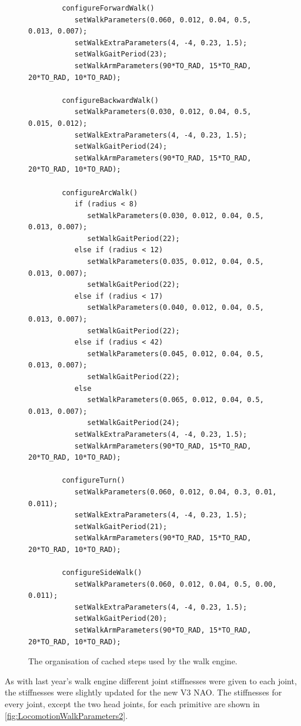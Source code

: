 \begin{figure}
	\begin{center}
		{\scriptsize\begin{verbatim}
		configureForwardWalk()
		   setWalkParameters(0.060, 0.012, 0.04, 0.5, 0.013, 0.007);
		   setWalkExtraParameters(4, -4, 0.23, 1.5);
		   setWalkGaitPeriod(23);
		   setWalkArmParameters(90*TO_RAD, 15*TO_RAD, 20*TO_RAD, 10*TO_RAD);

		configureBackwardWalk()
		   setWalkParameters(0.030, 0.012, 0.04, 0.5, 0.015, 0.012);
		   setWalkExtraParameters(4, -4, 0.23, 1.5);
		   setWalkGaitPeriod(24);
		   setWalkArmParameters(90*TO_RAD, 15*TO_RAD, 20*TO_RAD, 10*TO_RAD);

		configureArcWalk()
		   if (radius < 8)
		      setWalkParameters(0.030, 0.012, 0.04, 0.5, 0.013, 0.007);
		      setWalkGaitPeriod(22);
		   else if (radius < 12)
		      setWalkParameters(0.035, 0.012, 0.04, 0.5, 0.013, 0.007);
		      setWalkGaitPeriod(22);
		   else if (radius < 17)
		      setWalkParameters(0.040, 0.012, 0.04, 0.5, 0.013, 0.007);
		      setWalkGaitPeriod(22);
		   else if (radius < 42)
		      setWalkParameters(0.045, 0.012, 0.04, 0.5, 0.013, 0.007);
		      setWalkGaitPeriod(22);
		   else
		      setWalkParameters(0.065, 0.012, 0.04, 0.5, 0.013, 0.007);
		      setWalkGaitPeriod(24);
		   setWalkExtraParameters(4, -4, 0.23, 1.5);
		   setWalkArmParameters(90*TO_RAD, 15*TO_RAD, 20*TO_RAD, 10*TO_RAD);

		configureTurn()
		   setWalkParameters(0.060, 0.012, 0.04, 0.3, 0.01, 0.011);
		   setWalkExtraParameters(4, -4, 0.23, 1.5);
		   setWalkGaitPeriod(21);
		   setWalkArmParameters(90*TO_RAD, 15*TO_RAD, 20*TO_RAD, 10*TO_RAD);

		configureSideWalk()
		   setWalkParameters(0.060, 0.012, 0.04, 0.5, 0.00, 0.011);
		   setWalkExtraParameters(4, -4, 0.23, 1.5);
		   setWalkGaitPeriod(20);
		   setWalkArmParameters(90*TO_RAD, 15*TO_RAD, 20*TO_RAD, 10*TO_RAD);
		\end{verbatim}}
		\caption{The organisation of cached steps used by the walk engine.}
		\label{fig:LocomotionWalkParameters}
	\end{center}
\end{figure}

As with last year's walk engine \cite{JasonsAcraPaper} different joint stiffnesses were given to each joint, the stiffnesses were slightly updated for the new V3 NAO. The stiffnesses for every joint, except the two head joints, for each primitive are shown in \autoref{fig:LocomotionWalkParameters2}.

